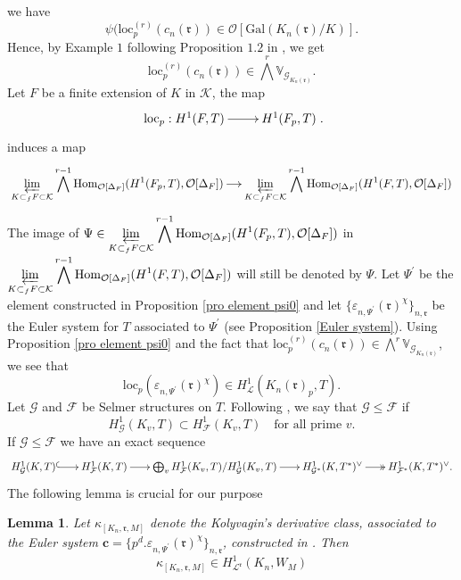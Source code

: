 \documentclass[reqno]{amsart}
\newcounter{dummy} \numberwithin{dummy}{section}
\newtheorem{lem}[dummy]{Lemma}
\begin{document}
we have
$$
\psi(\mathrm{loc}^{(r)}_{p}(c_{n}(\mathfrak{r}))\in
\mathcal{O}[\mathrm{Gal}(K_{n}(\mathfrak{r})/K)].
$$
Hence, by Example $1$ following Proposition $1.2$ in \cite{Rubin96},
we get
$$\mathrm{loc}^{(r)}_{p}(c_{n}(\mathfrak{r}))\in
\bigwedge^{r}\mathbb{V}_{\mathcal{G}_{K_{n}(\mathfrak{r})}}.
$$
Let $F$ be a finite extension of $K$ in $\mathcal{K}$, the map
$$
\xymatrix@=2pc{\mathrm{loc}_{p}:  H^{1}(F,T)\ar[r]& H^{1}(F_{p},T)}.
$$
induces a map
$$
\xymatrix@=1pc{\displaystyle{\varprojlim_{K\subset_{f}F\subset
\mathcal{K}}}\bigwedge^{r-1}\mathrm{Hom}_{\mathcal{O}[\Delta_{F}]}(H^{1}(F_{p},T),
\mathcal{O}[\Delta_{F}])\ar[r]&
\displaystyle{\varprojlim_{K\subset_{f}F\subset
\mathcal{K}}}\bigwedge^{r-1}\mathrm{Hom}_{\mathcal{O}[\Delta_{F}]}(H^{1}(F,T),
\mathcal{O}[\Delta_{F}])}
$$
 The image of
$\Psi\in\displaystyle{\varprojlim_{K\subset_{f}F\subset
\mathcal{K}}}\bigwedge^{r-1}\mathrm{Hom}_{\mathcal{O}[\Delta_{F}]}(H^{1}(F_{p},T),
\mathcal{O}[\Delta_{F}])$ in
$\displaystyle{\varprojlim_{K\subset_{f}F\subset
\mathcal{K}}}\bigwedge^{r-1}\mathrm{Hom}_{\mathcal{O}[\Delta_{F}]}(H^{1}(F,T),
\mathcal{O}[\Delta_{F}])$ will still be denoted by $\Psi$. Let
$\Psi^{\prime}$ be the element constructed in
 Proposition \ref{pro element psi0} and let $\{\varepsilon_{n,\Psi^{\prime}}(\mathfrak{r})^{\chi}\}_{n,\mathfrak{r}}$
 be the Euler system for $T$ associated to $\Psi^{\prime}$  (see Proposition \ref{Euler
 system}). Using Proposition \ref{pro element psi0} and the fact that  $\mathrm{loc}^{(r)}_{p}(c_{n}(\mathfrak{r}))\in
\bigwedge^{r}\mathbb{V}_{\mathcal{G}_{K_{n}(\mathfrak{r})}}$, we see
that
\begin{equation}\label{locp of Euler system and local condition}
\mathrm{loc}_{p}(\varepsilon_{n,\Psi^{\prime}}(\mathfrak{r})^{\chi})\in
H^{1}_{\mathcal{L}}(K_{n}(\mathfrak{r})_{p},T).
\end{equation}
Let $\mathcal{G}$ and $\mathcal{F}$ be Selmer structures on $T$.
Following \cite[\S 2.1]{MR04}, we say that $\mathcal{G}\leq
\mathcal{F}$ if
$$
H^{1}_{\mathcal{G}}(K_{v},T)\subset
H^{1}_{\mathcal{F}}(K_{v},T)\quad\mbox{for all prime $v$.}
$$
 If $\mathcal{G}\leq \mathcal{F}$ we
have an exact sequence \cite[Theorem 2.3.4]{MR04}
$$
\xymatrix@=1.5pc{H^{1}_{\mathcal{G}}(K,T)\ar@{^{(}->}[r]&
H^{1}_{\mathcal{F}}(K,T)\ar[r]&
\bigoplus_{v}H^{1}_{\mathcal{F}}(K_{v},T)/H^{1}_{\mathcal{G}}(K_{v},T)\ar[r]&
H^{1}_{\mathcal{G}^{\ast}}(K,T^{\ast})^{\vee}\ar@{->>}[r]&H^{1}_{\mathcal{F}^{\ast}}
(K,T^{\ast})^{\vee}.}
$$\vskip 6pt
The following lemma is crucial for our purpose
\begin{lem}\label{lemma kolyvagin class}
 Let
 $\kappa_{[K_{n},\mathfrak{r},M]}$ denote the Kolyvagin's derivative
 class, associated to the Euler system $\mathbf{c}=\{p^{d}.\varepsilon_{n,\Psi^{\prime}}(\mathfrak{r})^{\chi}\}_{n,\mathfrak{r}}$, constructed in
 \cite[Chap \textrm{IV},\S 4]{Rubin00}. Then
 $$
\kappa_{[K_{n},\mathfrak{r},M]}\in
H^{1}_{\mathcal{L}^{\mathfrak{r}}}(K_{n},W_{M})
$$
\end{lem}
\end{document}
